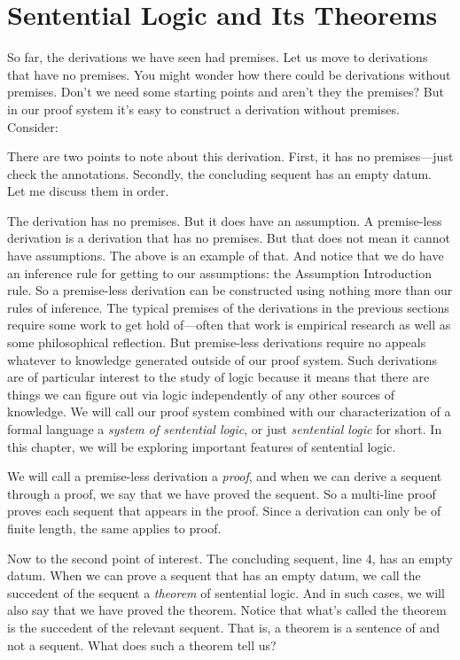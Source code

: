 



\section{Sentential Logic and Its Theorems}\label{sec:theorems}

So far, the derivations we have seen had premises.  Let us move to derivations 
that have no premises. You might wonder how there could be derivations without 
premises. Don't we need some starting points and aren't they the premises? But 
in our proof system it's easy to construct a derivation without premises.  
Consider:



There are two points to note about this derivation. First, it has no 
premises---just check the annotations. Secondly, the concluding sequent has an 
empty datum. Let me discuss them in order.

The derivation has no premises. But it does have an assumption.  A premise-less 
derivation is a derivation that has no premises.  But that does not mean it 
cannot have assumptions. The above is an example of that.  And notice that we do 
have an inference rule for getting to our assumptions: the Assumption 
Introduction rule.  So a premise-less derivation can be constructed using 
nothing more than our rules of inference.  The typical premises of the 
derivations in the previous sections require some work to get hold of---often 
that work is empirical research as well as some philosophical reflection.  But 
premise-less derivations require no appeals whatever to knowledge generated 
outside of our proof system.  Such derivations are of particular interest to the 
study of logic because it means that there are things we can figure out via 
logic independently of any other sources of knowledge. We will call our proof 
system combined with our characterization of a formal language \lL{} a 
\emph{system of sentential logic}, or just \emph{sentential logic} for short.  
In this chapter, we will be exploring important features of sentential logic.

We will call a premise-less derivation a \emph{proof}, and when we can derive a 
sequent through a proof, we say that we have proved the sequent. So a multi-line 
proof proves each sequent that appears in the proof. Since a derivation can only 
be of finite length, the same applies to proof. 

Now to the second point of interest. The concluding sequent, line 4, has an 
empty datum.  When we can prove a sequent that has an empty datum, we call the 
succedent of the sequent a \emph{theorem} of sentential logic. And in such cases, 
we will also say that we have proved the theorem. Notice that what's called the 
theorem is the succedent of the relevant sequent. That is, a theorem is a 
sentence of \lL{} and not a sequent.  What does such a theorem tell us? 

